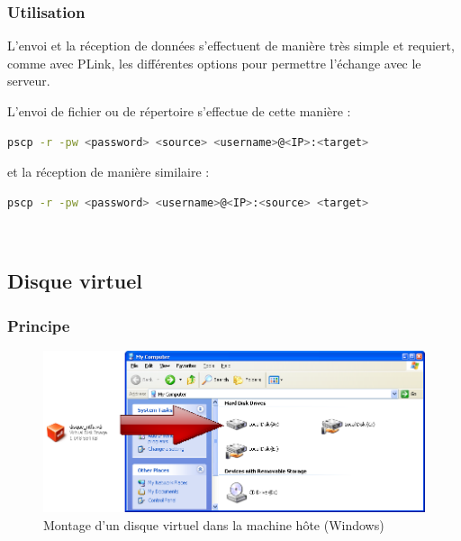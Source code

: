 
\subsubsection{Utilisation}

L'envoi et la réception de données s'effectuent de manière très simple et requiert, comme avec PLink, les différentes options pour permettre l'échange avec le serveur.

L'envoi de fichier ou de répertoire s'effectue de cette manière :
\begin{lstlisting}[language = sh]
pscp -r -pw <password> <source> <username>@<IP>:<target>
\end{lstlisting}
et la réception de manière similaire :
\begin{lstlisting}[language = sh]
pscp -r -pw <password> <username>@<IP>:<source> <target>
\end{lstlisting}
~~\\





\subsection{Disque virtuel}


\subsubsection{Principe}

\begin{figure}[!h]
	\center
	\includegraphics[scale=0.45]{img/Montage_Windows.png}
	\caption{Montage d'un disque virtuel dans la machine hôte (Windows)}
	\label{Montage Windows}
\end{figure}

